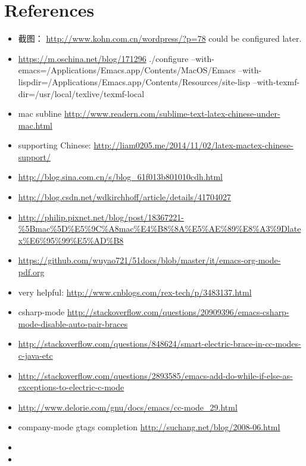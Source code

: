 \documentclass[9pt,b5paper]{article}
\begin{document}
\section{References}
\label{sec-3}
\begin{itemize}
\item 截图： \url{http://www.kohn.com.cn/wordpress/?p=78} could be configured later.
\item \url{https://m.oschina.net/blog/171296} ./configure --with-emacs=/Applications/Emacs.app/Contents/MacOS/Emacs --with-lispdir=/Applications/Emacs.app/Contents/Resources/site-lisp --with-texmf-dir=/usr/local/texlive/texmf-local
\item mac subline \url{http://www.readern.com/sublime-text-latex-chinese-under-mac.html}
\item supporting Chinese: \url{http://liam0205.me/2014/11/02/latex-mactex-chinese-support/}
\item \url{http://blog.sina.com.cn/s/blog_61f013b801010cdh.html}
\item \url{http://blog.csdn.net/wdkirchhoff/article/details/41704027}
\item \url{http://philip.pixnet.net/blog/post/18367221-\%5Bmac\%5D\%E5\%9C\%A8mac\%E4\%B8\%8A\%E5\%AE\%89\%E8\%A3\%9Dlatex\%E6\%95\%99\%E5\%AD\%B8}
\item \url{https://github.com/wuyao721/51docs/blob/master/it/emacs-org-mode-pdf.org}
\item very helpful: \url{http://www.cnblogs.com/rex-tech/p/3483137.html}
\item csharp-mode \url{http://stackoverflow.com/questions/20909396/emacs-csharp-mode-disable-auto-pair-braces}
\item \url{http://stackoverflow.com/questions/848624/smart-electric-brace-in-cc-modes-c-java-etc}
\item \url{http://stackoverflow.com/questions/2893585/emacs-add-do-while-if-else-as-exceptions-to-electric-c-mode}
\item \url{http://www.delorie.com/gnu/docs/emacs/cc-mode_29.html}
\item company-mode gtags completion \url{http://suchang.net/blog/2008-06.html}
\item 
\item 
\end{itemize}
\end{document}
